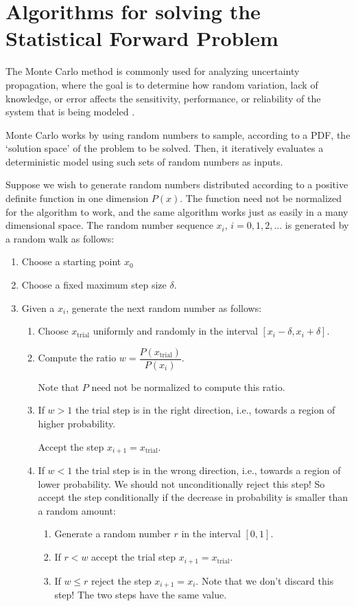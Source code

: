 \section{Algorithms for solving the Statistical Forward Problem}

The Monte Carlo method is commonly used for analyzing uncertainty propagation, where the goal is to determine how random variation, lack of knowledge, or error affects the sensitivity, performance, or reliability of the system that is being modeled \cite{RoCa04}.

Monte Carlo works by using random numbers to sample, according to a PDF, the `solution space' of the problem to be solved.
Then, it iteratively evaluates a deterministic model using such sets of random numbers as inputs.

Suppose we wish to generate random numbers distributed according to a positive definite function in one dimension $P(x)$.
The function need not be normalized for the algorithm to work, and the same algorithm works just
as easily in a many dimensional space. The random number sequence $x_i$, $i=0,1,2,\ldots$ is generated by a random walk as follows:

\begin{enumerate}
\item Choose a starting point $x_0$
\item Choose a fixed maximum step size $\delta$.
\item Given a $x_i$,  generate the next random number as follows: 
  \begin{enumerate}
  \item Choose $x_\text{trial}$  uniformly and randomly in the interval $[x_i-\delta, x_i+\delta]$.
  \item Compute the ratio $w=\dfrac{P(x_\text{trial})}{P(x_i)}$.
 
   Note that $P$ need not be normalized to compute this ratio.
  
  \item If $w >1$ the trial step is in the  right direction, i.e., towards a region of higher probability. 
  
  Accept the step $x_{i+1} =x_\text{trial}$.
  
  \item  If $w <1$ the trial step is in the wrong direction, i.e., towards a region of lower probability.  We should not unconditionally reject this step! So accept the step conditionally if the decrease in probability is smaller than a random amount:
     \begin{enumerate}
     \item Generate a random number $r$ in the interval $[0,1]$.
     \item If $r < w$ accept the trial step $x_{i+1} = x_\text{trial}$.
     \item If $w \leq r $ reject the step $x_{i+1}=x_i$. Note that we don't discard this step! The two steps have the same value.
     \end{enumerate}
  \end{enumerate}
\end{enumerate}

